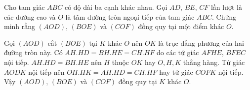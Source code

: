 \begin{prob}
	Cho tam giác $ABC$ có độ dài ba cạnh khác nhau. Gọi $AD$, $BE$, $CF$ lần lượt là các đường cao và $O$ là tâm đường tròn ngoại tiếp của tam giác $ABC$. Chứng minh rằng $(AOD)$, $(BOE)$ và $(COF)$ đồng quy tại một điểm khác $O$.
\end{prob}

\begin{center}

\end{center}

Gọi $(AOD)$ cắt $(BOE)$ tại $K$ khác $O$ nên $OK$ là trục đẳng phương của hai đường tròn này. Có $AH.HD = BH.HE = CH.HF$ do các tứ giác $AFHE$, $BFEC$ nội tiếp. $AH.HD = BH.HE$ nên $H$ thuộc $OK$ hay $O, H, K$ thẳng hàng. Tứ giác $AODK$ nội tiếp nên $OH.HK = AH.HD = CH.HF$ hay tứ giác $COFK$ nội tiếp. Vậy $(AOD)$, $(BOE)$ và $(COF)$ đồng quy tại $K$ khác $O$. 